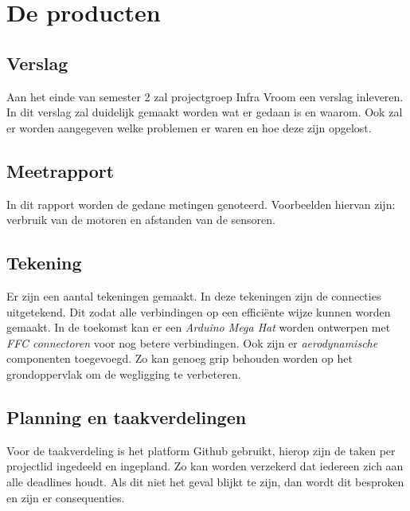 \section{De producten}
\subsection{Verslag}
Aan het einde van semester 2 zal projectgroep Infra Vroom een verslag inleveren. In dit verslag zal duidelijk gemaakt worden wat er gedaan is en waarom. Ook zal er worden aangegeven welke problemen er waren en hoe deze zijn opgelost.
\subsection{Meetrapport}
In dit rapport worden de gedane metingen genoteerd. Voorbeelden hiervan zijn: verbruik van de motoren en afstanden van de sensoren.
\subsection{Tekening}
Er zijn een aantal tekeningen gemaakt. In deze tekeningen zijn de connecties uitgetekend. Dit zodat alle verbindingen op een efficiënte wijze kunnen worden gemaakt. In de toekomst kan er een \textit{Arduino Mega Hat} worden ontwerpen met \textit{FFC connectoren} voor nog betere verbindingen.
Ook zijn er \textit{aerodynamische} componenten toegevoegd. Zo kan genoeg grip behouden worden op het grondoppervlak om de wegligging te verbeteren.
\subsection{Planning en taakverdelingen}
Voor de taakverdeling is het platform Github gebruikt, hierop zijn de taken per projectlid ingedeeld en ingepland. Zo kan worden verzekerd dat iedereen zich aan alle deadlines houdt. Als dit niet het geval blijkt te zijn, dan wordt dit besproken en zijn er consequenties.
